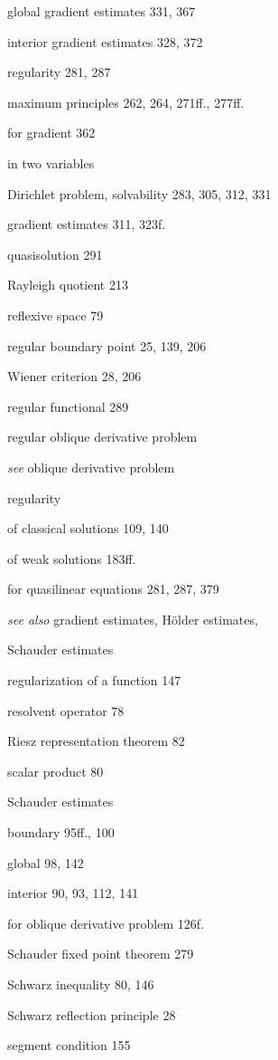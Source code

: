 \qquad global gradient estimates 331, 367

\qquad interior gradient estimates 328, 372

\qquad regularity 281, 287

\quad maximum principles 262, 264, 271ff., 277ff.

\qquad for gradient 362

\quad in two variables

\qquad Dirichlet problem, solvability 283, 305, 312, 331

\qquad gradient estimates 311, 323f.

quasisolution 291

Rayleigh quotient 213

reflexive space 79

regular boundary point 25, 139, 206

\quad Wiener criterion 28, 206

regular functional 289

regular oblique derivative problem

\quad \emph{see} oblique derivative problem

regularity

\quad of classical solutions 109, 140

\quad of weak solutions 183ff.

\quad for quasilinear equations 281, 287, 379

\quad \emph{see also} gradient estimates, H\"older estimates,

\qquad Schauder estimates

regularization of a function 147

resolvent operator 78

Riesz representation theorem 82

\vspace{1em}

scalar product 80

Schauder estimates

\quad boundary 95ff., 100

\quad global 98, 142

\quad interior 90, 93, 112, 141

\quad for oblique derivative problem 126f.

Schauder fixed point theorem 279

Schwarz inequality 80, 146

Schwarz reflection principle 28

segment condition 155

